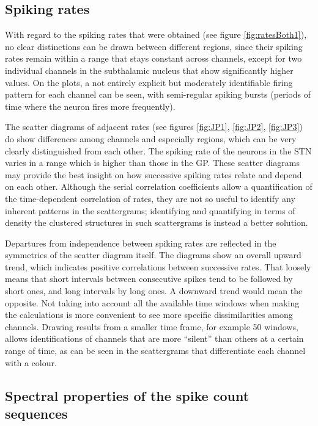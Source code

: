 \documentclass{kththesis}
\begin{document}
\subsection{Spiking rates}

With regard to the spiking rates that were obtained (see figure \ref{fig:ratesBoth1}), no clear distinctions can be drawn between different regions, since their spiking rates remain within a range that stays constant across channels, except for two individual channels in the subthalamic nucleus that show significantly higher values. 
On the plots, a not entirely explicit but moderately identifiable firing pattern for each channel can be seen, with semi-regular spiking bursts (periods of time where the neuron fires more frequently). 

The scatter diagrams of adjacent rates (see figures \ref{fig:JP1}, \ref{fig:JP2}, \ref{fig:JP3}) do show differences among channels and especially regions, which can be very clearly distinguished from each other. 
The spiking rate of the neurons in the STN varies in a range which is higher than those in the GP. 
These scatter diagrams may provide the best insight on how successive spiking rates relate and depend on each other. 
Although the serial correlation coefficients allow a quantification of the time-dependent correlation of rates, they are not so useful to identify any inherent patterns in the scattergrams; identifying and quantifying in terms of density the clustered structures in such scattergrams is instead a better solution. 

Departures from independence between spiking rates are reflected in the symmetries of the scatter diagram itself. 
The diagrams show an overall upward trend, which indicates positive correlations between successive rates. 
That loosely means that short intervals between consecutive spikes tend to be followed by short ones, and long intervals by long ones. 
A downward trend would mean the opposite.
Not taking into account all the available time windows when making the calculations is more convenient to see more specific dissimilarities among channels. 
Drawing results from a smaller time frame, for example 50 windows, allows identifications of channels that are more “silent” than others at a certain range of time, as can be seen in the scattergrams that differentiate each channel with a colour. 

\subsection{Spectral properties of the spike count sequences}
\end{document}
